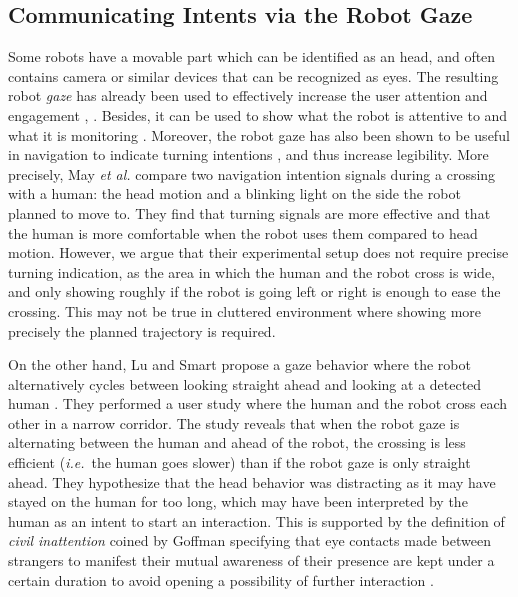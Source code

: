 \documentclass[a4paper,11pt,twoside]{StyleThese}
\begin{document}
\subsection{Communicating Intents via the Robot Gaze}
Some robots have a movable part which can be identified as an head, and often contains camera or similar devices that can be recognized as eyes. The resulting robot \textit{gaze} has already been used to effectively increase the user attention and engagement \cite{mutlu_storytelling_2006}, \cite{zaraki_designing_2014}. Besides, it can be used to show what the robot is attentive to and what it is monitoring \cite{breazeal2005effects}. Moreover, the robot gaze has also been shown to be useful in navigation to indicate turning intentions \cite{lu_towards_2013, may_show_2015}, and thus increase legibility. More precisely, May \textit{et al.} compare two navigation intention signals during a crossing with a human: the head motion and a blinking light on the side the robot planned to move to. They find that turning signals are more effective and that the human is more comfortable when the robot uses them compared to head motion. However, we argue that their experimental setup does not require precise turning indication, as the area in which the human and the robot cross is wide, and only showing roughly if the robot is going left or right is enough to ease the crossing. This may not be true in cluttered environment where showing more precisely the planned trajectory is required. 

On the other hand, Lu and Smart propose a gaze behavior where the robot alternatively cycles between looking straight ahead and looking at a detected human \cite{lu_towards_2013}. They performed a user study where the human and the robot cross each other in a narrow corridor. The study reveals that when the robot gaze is alternating between the human and ahead of the robot, the crossing is less efficient (\textit{i.e.}~the human goes slower) than if the robot gaze is only straight ahead. They hypothesize that the head behavior was distracting as it may have stayed on the human for too long, which may have been interpreted by the human as an intent to start an interaction. This is supported by the definition of \textit{civil inattention} coined by Goffman specifying that eye contacts made between strangers to manifest their mutual awareness of their presence are kept under a certain duration to avoid opening a possibility of further interaction \cite{goffman_behavior_1966}.
\end{document}
